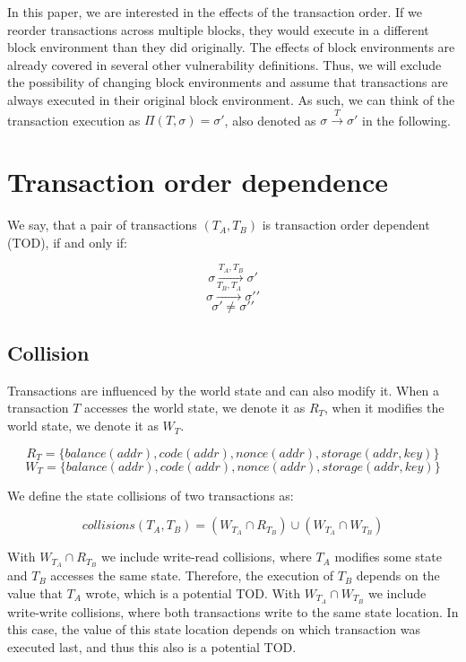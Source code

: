 \documentclass[draft,final]{vutinfth} %
\begin{document}
In this paper, we are interested in the effects of the transaction order. If we reorder transactions across multiple blocks, they would execute in a different block environment than they did originally. The effects of block environments are already covered in several other vulnerability definitions. Thus, we will exclude the possibility of changing block environments and assume that transactions are always executed in their original block environment. As such, we can think of the transaction execution as $\Pi(T, \sigma) = \sigma\prime$, also denoted as $\sigma \xrightarrow{T} \sigma\prime$ in the following.


\section{Transaction order dependence}

We say, that a pair of transactions $(T_A, T_B)$ is transaction order dependent (TOD), if and only if:

$$\sigma \xrightarrow{T_A, T_B} \sigma \prime$$
$$\sigma \xrightarrow{T_B, T_A} \sigma \prime \prime$$
$$\sigma \prime \neq \sigma \prime \prime$$


\subsection{Collision}

Transactions are influenced by the world state and can also modify it. When a transaction $T$ accesses the world state, we denote it as $R_T$, when it modifies the world state, we denote it as $W_T$.

$$R_T = \{ balance(addr), code(addr), nonce(addr), storage(addr, key) \}$$
$$W_T = \{ balance(addr), code(addr), nonce(addr), storage(addr, key) \}$$

We define the state collisions of two transactions as:

$$collisions(T_A, T_B) = (W_{T_A} \cap R_{T_B}) \cup (W_{T_A} \cap W_{T_B})$$ 

With $W_{T_A} \cap R_{T_B}$ we include write-read collisions, where $T_A$ modifies some state and $T_B$ accesses the same state. Therefore, the execution of $T_B$ depends on the value that $T_A$ wrote, which is a potential TOD. With $W_{T_A} \cap W_{T_B}$ we include write-write collisions, where both transactions write to the same state location. In this case, the value of this state location depends on which transaction was executed last, and thus this also is a potential TOD.
\end{document}
